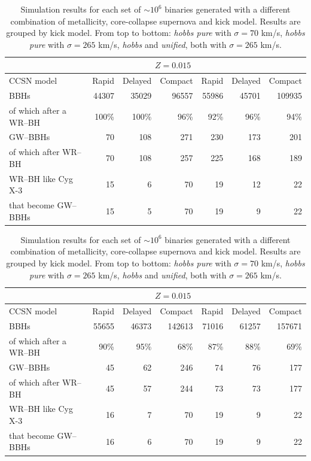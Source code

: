 \documentclass[a4paper,titlepage]{book}     	%
\begin{document}
\begin{table}[htbp!]
\begin{tabular}{l >{\hspace{1pc}}rrr >{\hspace{2pc}}rrr}
		\toprule
		& \multicolumn{3}{c}{$Z=0.02$} & \multicolumn{3}{c}{$Z=0.015$}  \\
		\midrule
		CCSN model & Rapid & Delayed & Compact&  Rapid & Delayed & Compact\\
		\midrule
		BBHs                      		& 44307 & 35029 & 96557 & 55986 & 45701 & 109935 \\
		of which after a WR--BH			& 100\% & 100\% & 96\% & 92\% & 96\% & 94\% \\
		\hline
		GW--BBHs  						& 70 & 108 & 271 & 230 & 173 & 201 \\
		of which after WR--BH			& 70 & 108 & 257 & 225 & 168 & 189 \\
		\hline
		WR--BH like Cyg X-3  	 		& 15 & 6 & 70 & 19 & 12 & 22 \\
		that become GW--BBHs   		 	& 15 & 5 & 70 & 19 & 9 & 22 \\
		\bottomrule 	
	\end{tabular}%
	\vfill
		\begin{tabular}{l >{\hspace{1pc}}rrr >{\hspace{2pc}}rrr}
	    \toprule
		& \multicolumn{3}{c}{$Z=0.02$} & \multicolumn{3}{c}{$Z=0.015$}  \\
		\midrule
		CCSN model & Rapid & Delayed & Compact&  Rapid & Delayed & Compact\\
		\midrule
		BBHs  		& 55655 & 46373 & 142613 & 71016 & 61257 & 157671 \\
		of which after a WR--BH	& 90\% & 95\% & 68\% & 87\% & 88\%& 69\% \\
		\hline
		GW--BBHs  		& 45 & 62 & 246 & 74 & 76 & 177 \\
		of which after WR--BH	& 45 & 57 & 244 & 73 & 73 & 177 \\
		\hline
		WR--BH like Cyg X-3  	 & 16 & 7 & 70 & 19 & 9 & 22 \\
		that become GW--BBHs   		 & 16 & 6 & 70 & 19 & 9 & 22 \\
		\bottomrule 	
	\end{tabular}%
	\caption{Simulation results for each set of $\sim 10^{6}$ binaries generated with a different combination of metallicity, core-collapse supernova and kick model. Results are grouped by kick model. From top to bottom: \emph{hobbs pure} with $\sigma = 70$ km/s,  \emph{hobbs pure} with $\sigma = 265$ km/s,  \emph{hobbs} and \emph{unified}, both with $\sigma = 265$ km/s.}\label{tab:simulationresults}
\end{table}
\end{document}
